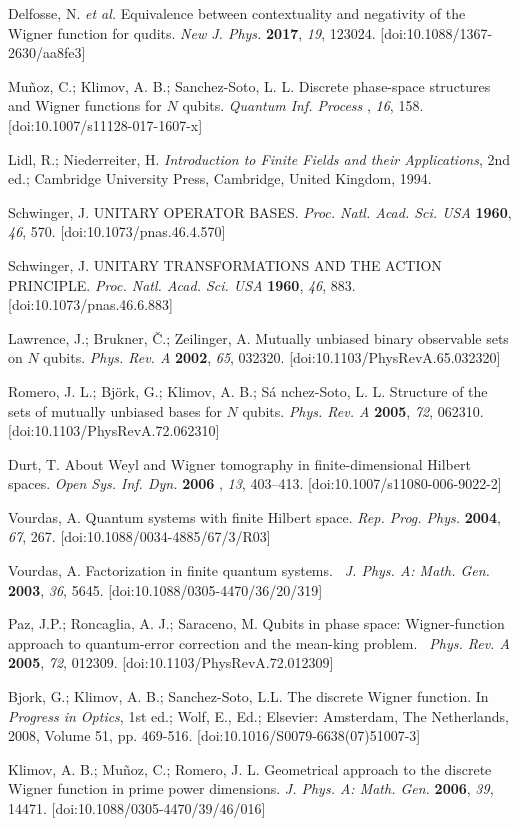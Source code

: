 \documentclass{article}
\begin{document}
\begin{thebibliography}{99}
 Delfosse, N. \textit{et al.} Equivalence between
contextuality and negativity of the Wigner function for qudits. \textit{New
J. Phys.} \textbf{2017}, \textit{19}, 123024. [doi:10.1088/1367-2630/aa8fe3]

 Mu\~noz, C.; Klimov, A. B.; Sanchez-Soto, L. L. Discrete
phase-space structures and Wigner functions for $N$ qubits. \textit{Quantum
Inf. Process} , \textit{16}, 158. [doi:10.1007/s11128-017-1607-x]

 Lidl, R.; Niederreiter, H. \textit{Introduction to Finite
Fields and their Applications}, 2nd ed.; Cambridge University Press,
Cambridge, United Kingdom, 1994.

 Schwinger, J. UNITARY OPERATOR BASES. \textit{Proc.
Natl. Acad. Sci. USA} \textbf{1960}, \textit{46}, 570.
[doi:10.1073/pnas.46.4.570]

 Schwinger, J. UNITARY TRANSFORMATIONS AND THE ACTION
PRINCIPLE. \textit{Proc. Natl. Acad. Sci. USA} \textbf{1960}, \textit{46},
883. [doi:10.1073/pnas.46.6.883]

 Lawrence, J.; Brukner, \v{C}.; Zeilinger, A. Mutually
unbiased binary observable sets on $N$ qubits. \textit{Phys. Rev. A} \textbf{%
2002}, \textit{65}, 032320. [doi:10.1103/PhysRevA.65.032320]

 Romero, J. L.; Bj\"{o}rk, G.; Klimov, A. B.; S\'{a}%
nchez-Soto, L. L. Structure of the sets of mutually unbiased bases for $N$
qubits. \textit{Phys. Rev. A} \textbf{2005}, \textit{72}, 062310.
[doi:10.1103/PhysRevA.72.062310]

 Durt, T. About Weyl and Wigner tomography in
finite-dimensional Hilbert spaces. \textit{Open Sys. Inf. Dyn.} \textbf{2006}%
, \textit{13}, 403--413. [doi:10.1007/s11080-006-9022-2]

 Vourdas, A. Quantum systems with finite Hilbert space. 
\textit{Rep. Prog. Phys.} \textbf{2004}, \textit{67}, 267.
[doi:10.1088/0034-4885/67/3/R03]

 Vourdas, A. Factorization in finite quantum systems. 
\textit{\ J. Phys. A: Math. Gen.} \textbf{2003}, \textit{36}, 5645.
[doi:10.1088/0305-4470/36/20/319]

 Paz, J.P.; Roncaglia, A. J.; Saraceno, M. Qubits in phase
space: Wigner-function approach to quantum-error correction and the
mean-king problem. \textit{\ Phys. Rev. A} \textbf{2005}, \textit{72},
012309. [doi:10.1103/PhysRevA.72.012309]

 Bjork, G.; Klimov, A. B.; Sanchez-Soto, L.L. The discrete
Wigner function. In \textit{Progress in Optics}, 1st ed.; Wolf, E., Ed.;
Elsevier: Amsterdam, The Netherlands, 2008, Volume 51, pp. 469-516.
[doi:10.1016/S0079-6638(07)51007-3]

 Klimov, A. B.; Mu\~{n}oz, C.; Romero, J. L. Geometrical
approach to the discrete Wigner function in prime power dimensions. \textit{%
J. Phys. A: Math. Gen.} \textbf{2006}, \textit{39}, 14471.
[doi:10.1088/0305-4470/39/46/016]
\end{thebibliography}
\end{document}
